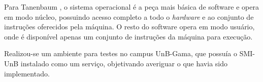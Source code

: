 Para Tanenbaum \cite{tanenbaum_2007}, o sistema operacional é a peça mais básica de software e opera em modo núcleo, possuindo acesso completo a todo o \textit{hardware} e ao conjunto de instruções oferecidos pela máquina. O resto do software opera em modo usuário, onde é disponível apenas um conjunto de instruções da máquina para execução.

Realizou-se um ambiente para testes no campus UnB-Gama, que possuía o SMI-UnB instalado como um serviço, objetivando averiguar o que havia sido implementado.